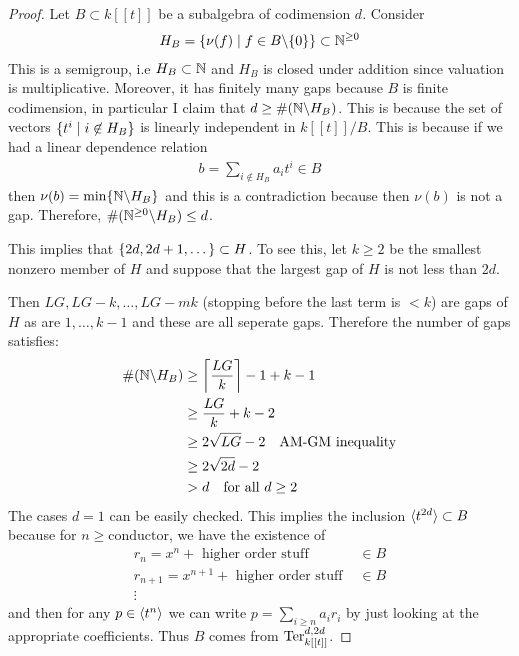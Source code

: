 \documentclass[12pt]{article}
\begin{document}
\begin{proof}
    Let $B\subset k[[t]]$ be a subalgebra of codimension $d$. Consider
\begin{align*}
    H_B = \{\nu(f) \mid f\in B\backslash\{0\}\} \subset \mathbb{N}^{\geq 0 }
\end{align*} This is a semigroup, i.e $H_B\subset \mathbb{N}$ and $H_B$ is closed under addition since valuation 
is multiplicative. Moreover, it has finitely many gaps because $B$ is finite codimension, in particular
I claim that $d\geq \# (\mathbb{N}\backslash H_B)$. This is because the set of vectors $\{t^i\mid i\not\in H_B\}$ is linearly independent
in $k[[t]]/B$. This is because if we had a linear dependence relation \begin{align*}
    b = \sum_{i\not\in H_B} a_it^i \in B
\end{align*} then $\nu(b) = \min\{\mathbb{N}\backslash H_B\}$ and this is a contradiction because then $\nu(b)$ is not a gap. Therefore, $\# (\mathbb{N}^{\geq 0}\backslash H_B) \leq d$. 

\hfill

This implies that $\{2d,2d+1,\dots\}\subset H$. To see this, let $k\geq 2$ be the smallest nonzero member of $H$
and suppose that the largest gap of $H$ is not less than $2d$.

\hfill 

Then $LG,LG-k,\dots, LG-mk$ (stopping before the last term is $<k$) are gaps of $H$ as are $1,\dots, k-1$
and these are all seperate gaps. Therefore the number of gaps satisfies:
\begin{align*}
    \# (\mathbb{N}\backslash H_B) &\geq \left\lceil\frac{LG}{k}\right\rceil - 1 + k - 1 \\
    &\geq \frac{LG}{k} + k - 2\\
    &\geq 2\sqrt{LG} - 2 \text{\quad AM-GM inequality}\\
    &\geq 2\sqrt{2d} - 2 \\
    &> d\text{\quad for all $d \geq 2$}
\end{align*} The cases $d = 1$ can be easily checked. 
This implies the inclusion $\langle{t^{2d}}\rangle\subset B$ because for $n\geq \text{conductor}$,
we have the existence of \begin{align*}
    r_n = x^n + \text{ higher order stuff }  &\in B \\
    r_{n+1} = x^{n+1} + \text{ higher order stuff } &\in B \\
    \vdots
\end{align*} and then for any $p\in\langle{t^n}\rangle$ we can write $p = \sum_{i\geq n} a_ir_i$ by just
looking at the appropriate coefficients. Thus $B$ comes from $\operatorname{Ter}^{d,2d}_{k[[t]]}$.
\end{proof}
\end{document}
